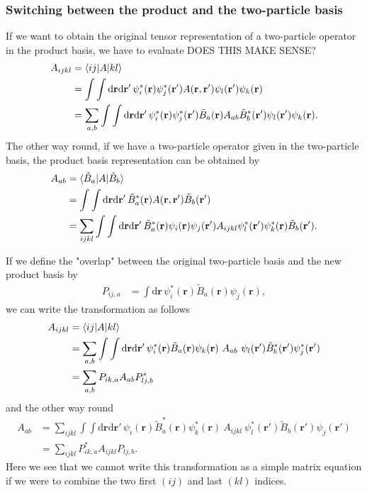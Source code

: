 \documentclass[12pt,a4paper]{scrartcl}
\numberwithin{equation}{section}
\newcommand{\cng}[1]{{\color{red}#1}}
\renewcommand{\vec}{\mathbf}
\begin{document}
\subsubsection{Switching between the product and the two-particle basis}
If we want to obtain the original tensor representation of a two-particle operator in the 
product basis, we have to evaluate \cng{DOES THIS MAKE SENSE?}
\begin{align}
A_{ijkl} &= \braket{ij | A | kl }  \\
&= \int \int \mathrm{d}\vec{r}\mathrm{d}\vec{r}' \, \psi^*_i(\vec{r})\psi^*_j(\vec{r}') 
                                          A(\vec{r},\vec{r}') \psi_l(\vec{r}')\psi_k(\vec{r}) \\
&= \sum_{a,b}\int \int \mathrm{d}\vec{r}\mathrm{d}\vec{r}' \, \psi^*_i(\vec{r})\psi^*_j(\vec{r}') 
         \tilde{B}_a(\vec{r}) A_{ab}\tilde{B}^*_b(\vec{r}') \psi_l(\vec{r}')\psi_k(\vec{r}).
\end{align}
The other way round, if we have a two-particle operator given in the two-particle basis, the product basis
representation can be obtained by
\begin{align}
A_{ab}
&= \braket{ \tilde{B}_a | A | \tilde{B}_b } \\
&= \int \int \mathrm{d}\vec{r}\mathrm{d}\vec{r}' \,  \tilde{B}^*_a(\vec{r})  A(\vec{r},\vec{r}') \tilde{B}_b(\vec{r}') \\
&=\sum_{ijkl} \int \int \mathrm{d}\vec{r}\mathrm{d}\vec{r}' \,  \tilde{B}^*_a(\vec{r})  
    \psi_i(\vec{r})\psi_j(\vec{r}') A_{ijkl} \psi^*_l(\vec{r}')\psi^*_k(\vec{r}) \tilde{B}_b(\vec{r}') .
\end{align}

If we define the "overlap" between the original two-particle
basis and the new product basis by
\begin{align}
P_{ij,a}
&= \int  \mathrm{d}\vec{r}\, \psi^*_i(\vec{r}) \tilde{B}_a(\vec{r}) \psi_j(\vec{r}) ,
\end{align}
we can write the transformation as follows
\begin{align}
A_{ijkl} &= \braket{ij | A | kl }  \\
&= \sum_{a,b}\int \int \mathrm{d}\vec{r}\mathrm{d}\vec{r}' \, \psi^*_i(\vec{r}) \tilde{B}_a(\vec{r}) \psi_k(\vec{r})
      \   A_{ab}\ \psi_l(\vec{r}') \tilde{B}^*_b(\vec{r}') \psi^*_j(\vec{r}') \\
&= \sum_{a,b} P_{ik,a} A_{ab} P^*_{lj,b}
\end{align}
and the other way round
\begin{align}
A_{ab}
&=\sum_{ijkl} \int \int \mathrm{d}\vec{r}\mathrm{d}\vec{r}' \,  \psi_i(\vec{r}) \tilde{B}^*_a(\vec{r}) \psi^*_k(\vec{r}) 
     \ A_{ijkl}\  \psi^*_l(\vec{r}') \tilde{B}_b(\vec{r}') \psi_j(\vec{r}') \\
%
&= \sum_{ijkl} P^*_{ik,a}  A_{ijkl} P_{lj,b}.
\end{align}
Here we see that we cannot write this transformation as a simple matrix equation
if we were to combine the two first $(ij)$ and last $(kl)$ indices.
\end{document}
